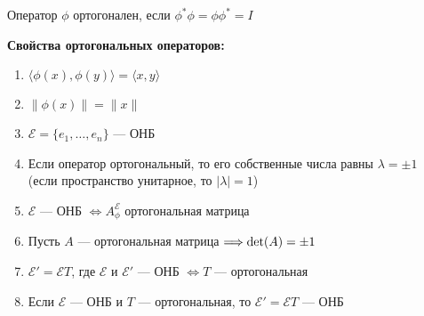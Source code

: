 \begin{shdef}
    \begin{definition}
        Оператор $ \phi $ ортогонален, если $ \phi^* \phi = \phi \phi^* = I$
    \end{definition}
\end{shdef}

\vspace{0.2cm}


\textbf{Свойства ортогональных операторов:}
\begin{enumerate}
    \item $\langle \phi(x), \phi(y) \rangle = \langle x, y \rangle$
    \item $\|\phi(x)\| = \|x\|$
    \item $\mathcal{E} = \{e_{1}, \ldots, e_{n}\}$ — ОНБ
    \item Если оператор ортогональный, то его собственные числа равны $\lambda = \pm 1$ \\
          (если пространство унитарное, то $|\lambda| = 1$)
    \item $\mathcal{E}$ — ОНБ $\iff A_{\phi}^{\mathcal{E}}$ ортогональная матрица
    \item Пусть $A$ — ортогональная матрица $\Longrightarrow \det(A) = \pm 1$
    \item $\mathcal{E}' = \mathcal{E} T$, где $\mathcal{E}$ и $\mathcal{E}'$ — ОНБ $\iff T$ — ортогональная
    \item Если $\mathcal{E}$ — ОНБ и $T$ — ортогональная, то $\mathcal{E}' = \mathcal{E} T$ — ОНБ
\end{enumerate}


